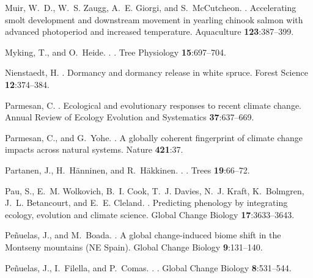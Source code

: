 \documentclass{article}
\begin{document}
\begin{thebibliography}{131}
Muir, W.~D., W.~S. Zaugg, A.~E. Giorgi, and S.~McCutcheon.
.
\newblock Accelerating smolt development and downstream movement in yearling
  chinook salmon with advanced photoperiod and increased temperature.
\newblock Aquaculture {\bf 123}:387--399.

Myking, T., and O.~Heide.
.
.
\newblock Tree Physiology {\bf 15}:697--704.

Nienstaedt, H.
.
\newblock Dormancy and dormancy release in white spruce.
\newblock Forest Science {\bf 12}:374--384.

Parmesan, C.
.
\newblock Ecological and evolutionary responses to recent climate change.
\newblock Annual Review of Ecology Evolution and Systematics {\bf 37}:637--669.

Parmesan, C., and G.~Yohe.
.
\newblock A globally coherent fingerprint of climate change impacts across
  natural systems.
\newblock Nature {\bf 421}:37.

Partanen, J., H.~H{\"a}nninen, and R.~H{\"a}kkinen.
.
.
\newblock Trees {\bf 19}:66--72.

Pau, S., E.~M. Wolkovich, B.~I. Cook, T.~J. Davies, N.~J. Kraft, K.~Bolmgren,
  J.~L. Betancourt, and E.~E. Cleland.
.
\newblock Predicting phenology by integrating ecology, evolution and climate
  science.
\newblock Global Change Biology {\bf 17}:3633--3643.

Pe{\~n}uelas, J., and M.~Boada.
.
\newblock A global change-induced biome shift in the {Montseny mountains (NE
  Spain)}.
\newblock Global Change Biology {\bf 9}:131--140.

Pe{\~n}uelas, J., I.~Filella, and P.~Comas.
.
.
\newblock Global Change Biology {\bf 8}:531--544.


\end{thebibliography}
\end{document}
